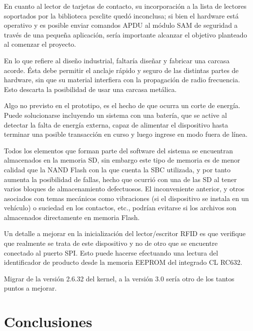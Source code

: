 \documentclass[%
        final,
        notitlepage,
        narroweqnarray,
        inline,
        ]{ieee}
\begin{document}
En cuanto al lector de tarjetas de contacto, su incorporación a la lista
de lectores soportados por la biblioteca pcsclite quedó inconclusa; si 
bien el hardware está operativo y es posible enviar comandos APDU al 
módulo SAM de seguridad a través de una pequeña aplicación, sería 
importante alcanzar el objetivo planteado al comenzar el proyecto.

En lo que refiere al diseño industrial, faltaría diseñar y fabricar una carcasa acorde. 
Ésta debe permitir el anclaje rápido y seguro de las distintas partes de hardware, sin 
que su material interfiera con la propagación de radio frecuencia. Esto descarta la 
posibilidad de usar una carcasa metálica.

Algo no previsto en el prototipo, es el hecho de que ocurra un corte de energía. Puede
solucionarse incluyendo un sistema con una batería, que se active al detectar la falta de 
energía externa, capaz de alimentar el dispositivo hasta terminar una posible transacción en 
curso y luego ingrese en modo fuera de línea.

Todos los elementos que forman parte del software del sistema se encuentran almacenados
en la memoria SD, sin embargo este tipo de memoria es de menor calidad que la NAND Flash
con la que cuenta la SBC utilizada, y por tanto aumenta la posibilidad de fallas, hecho que 
ocurrió con una de las SD al tener varios bloques de almacenamiento defectuosos. El 
inconveniente anterior, y otros asociados con temas mecánicos como vibraciones (si el 
dispositivo se instala en un vehículo) o suciedad en los contactos, etc., podrían evitarse 
si los archivos son almacenados directamente en memoria Flash.

Un detalle a mejorar en la inicialización del lector/escritor RFID es que verifique
que realmente se trata de este dispositivo y no de otro que se encuentre conectado
al puerto SPI. Esto puede hacerse efectuando una lectura del identificador de producto
desde la memoria EEPROM del integrado CL RC632.

Migrar de la versión 2.6.32 del kernel, a la versión 3.0 sería otro de los tantos puntos a mejorar.


\section{Conclusiones}
\end{document}
